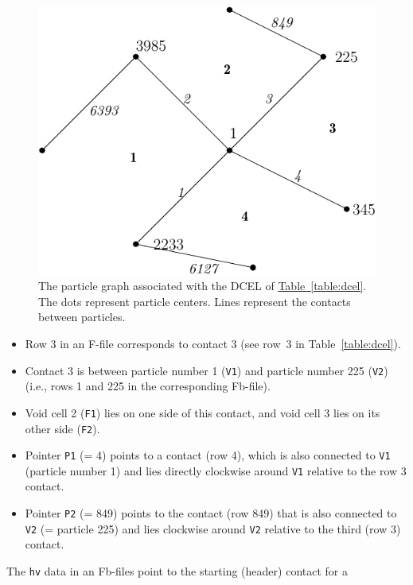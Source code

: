 \documentclass[letterpaper,11pt]{article}
\begin{document}
\begin{figure}
  \centering
  \includegraphics{Figures/dcel.pdf}
  \caption{The particle graph associated with the DCEL of
  	\hyperref[table:dcel]{Table~\ref*{table:dcel}}.
           The dots represent particle centers.  Lines represent the contacts between
           particles.}
           \label{fig:dcel}
\end{figure}
%
\begin{itemize}
\item
Row 3 in an F-file corresponds to contact 3
(see row~3 in Table~\ref{table:dcel}).
\item
Contact 3 is between particle number 1 (\texttt{V1})
and particle number 225 (\texttt{V2})
(i.e., rows 1 and 225 in the corresponding Fb-file).
\item
Void cell 2 (\texttt{F1}) lies on one side of this
contact, and void cell 3 lies on its other side (\texttt{F2}).
\item
Pointer \texttt{P1} (= 4) points to a contact (row 4),
which is also connected to \texttt{V1} (particle number 1)
and lies directly clockwise around \texttt{V1} relative to the 
row 3 contact.
\item
Pointer \texttt{P2} (= 849) points to the contact (row 849)
that is also connected to \texttt{V2} (= particle 225)
and lies clockwise around \texttt{V2} relative
to the third (row 3) contact.
\end{itemize}
The \texttt{hv} data in an Fb-files point to the starting
(header) contact for a
\end{document}
